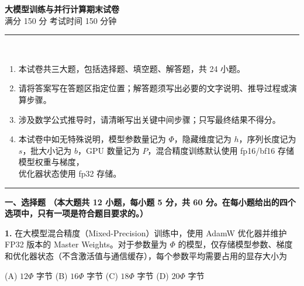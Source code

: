 \documentclass[a4paper]{ctexart}
\newcommand{\titlefont}{\fontsize{18pt}{24pt}\selectfont}
\newcommand{\subtitlefont}{\fontsize{14pt}{20pt}\selectfont}
\newcommand{\bodyfont}{\fontsize{12pt}{16pt}\selectfont}
\newcommand{\noticeblock}[1]{%
  \vspace{0.3em}%
  \noindent\rule{\linewidth}{0.8pt}%
  \vspace{0.3em}%
  \noindent{\heiti\bfseries 注意事项：}\\%
  \vspace{0.1em}%
  \songti #1%
  \vspace{0.3em}%
  \noindent\rule{\linewidth}{0.8pt}%
  \vspace{0.5em}%
}
\begin{document}
\bodyfont   %

\begin{center}
\vspace*{-0.5em}
{\titlefont\heiti\bfseries 大模型训练与并行计算期末试卷}\\[0.4em]
{\subtitlefont\songti 满分 150 分 \quad 考试时间 150 分钟}\\[0.3em]

\end{center}
\vspace{0.3em}

\noticeblock{%
  \begin{enumerate}[leftmargin=2.5em,itemsep=0pt,topsep=2pt,parsep=0pt]
    \item 本试卷共三大题，包括选择题、填空题、解答题，共 24 小题。
    \item 请将答案写在答题区指定位置；解答题须写出必要的文字说明、推导过程或演算步骤。
    \item 涉及数学公式推导时，请清晰写出关键中间步骤；只写最终结果不得分。
    \item 本试卷中如无特殊说明，模型参数量记为 $\Phi$，隐藏维度记为 $h$，序列长度记为 $s$，批大小记为 $b$，GPU 数量记为 $P$，混合精度训练默认使用 fp16/bf16 存储模型权重与梯度，\\优化器状态使用 fp32 存储。
  \end{enumerate}
}

\vspace{0.5em}

{\bodyfont\heiti\bfseries 一、选择题%
{\bodyfont\songti\bfseries （本大题共 12 小题，每小题 5 分，共 60 分。在每小题给出的四个选项中，只有一项是符合题目要求的。）}}

\vspace{0.5em}

\noindent\textbf{1.} 在大模型混合精度（Mixed-Precision）训练中，使用 AdamW 优化器并维护 FP32 版本的 Master Weights。对于参数量为 $\Phi$ 的模型，仅存储模型参数、梯度和优化器状态（不含激活值与通信缓存），每个参数平均需要占用的显存大小为

\noindent\hspace{1em}(A) $12\Phi$ 字节 \quad (B) $16\Phi$ 字节 \quad (C) $18\Phi$ 字节 \quad (D) $20\Phi$ 字节

\vspace{0.5em}
\end{document}
